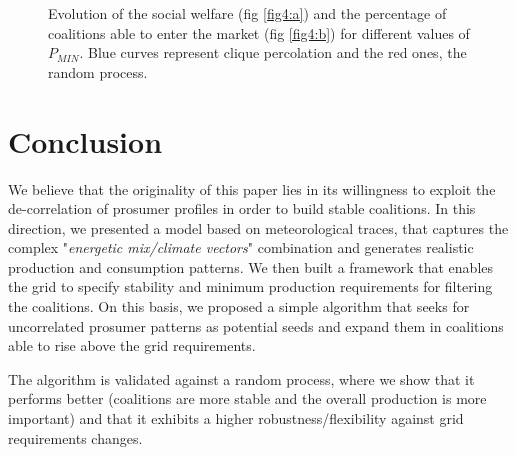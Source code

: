 \documentclass[conference]{IEEEtran}
\begin{document}
\begin{figure}
 \centering
  \hspace{1em}%
\caption{Evolution of the social welfare (fig \ref{fig4:a}) and the percentage of coalitions able to enter the market (fig \ref{fig4:b}) for different values of $ P_{MIN} $. Blue curves represent clique percolation and the red ones, the random process.}
\label{Fig4}
\end{figure}


%
%
\section{Conclusion}
\label{sec:conclusion}

We believe that the originality of this paper lies in its willingness to exploit the de-correlation of prosumer profiles in order to build stable coalitions. In this direction, we presented a model based on meteorological traces, that captures the complex "\textit{energetic mix/climate vectors}" combination and generates realistic production and consumption patterns. We then built a framework that enables the grid to specify stability and minimum production requirements for filtering the coalitions. On this basis, we proposed a simple algorithm that seeks for uncorrelated prosumer patterns as potential seeds and expand them in coalitions able to rise above the grid requirements.

The algorithm is validated against a random process, where we show that it performs better (coalitions are more stable and the overall production is more important) and that it exhibits a higher robustness/flexibility against grid requirements changes.
\end{document}
